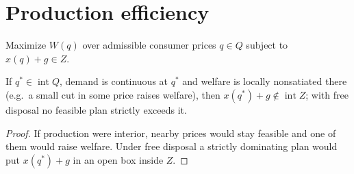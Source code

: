 \section{Production efficiency}

\begin{definition}
\label{def:dm}
\leanok
Maximize $W(q)$ over admissible consumer prices $q\in Q$ subject to $x(q)+g\in Z$.
\end{definition}

\begin{theorem}
\label{thm:dm}
\leanok
{}
If $q^*\in\operatorname{int}Q$, demand is continuous at $q^*$ and welfare is locally nonsatiated there (e.g.\ a small cut in
some price raises welfare), then $x(q^*)+g\notin\operatorname{int}Z$; with free disposal no feasible plan strictly exceeds it.
\end{theorem}
\begin{proof}
\leanok
If production were interior, nearby prices would stay feasible and one of them would raise welfare. Under free disposal a
strictly dominating plan would put $x(q^*)+g$ in an open box inside $Z$.
\end{proof}
